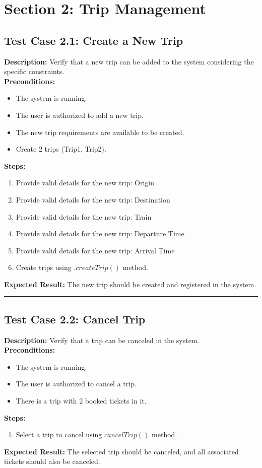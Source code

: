 \documentclass{article}
\begin{document}
\pagebreak

\section{Section 2: Trip Management}
\bigskip
\bigskip
\subsection{Test Case 2.1: Create a New Trip}

\textbf{Description:} Verify that a new trip can be added to the system considering the specific constraints.\\
\textbf{Preconditions:}
\begin{itemize}
  \item The system is running.
  \item The user is authorized to add a new trip.
  \item The new trip requirements are available to be created.
  \item Create 2 trips (Trip1, Trip2).
\end{itemize}
\textbf{Steps:}
\begin{enumerate}
  \item Provide valid details for the new trip: Origin
  \item Provide valid details for the new trip: Destination
  \item Provide valid details for the new trip: Train
  \item Provide valid details for the new trip: Departure Time
  \item Provide valid details for the new trip: Arrival Time
  \item Create trips using $.createTrip()$ method.
\end{enumerate}
\textbf{Expected Result:} The new trip should be created and registered in the system.

\bigskip
\hrule
\bigskip

\subsection{Test Case 2.2: Cancel Trip}

\textbf{Description:} Verify that a trip can be canceled in the system.\\
\textbf{Preconditions:}
\begin{itemize}
  \item The system is running.
  \item The user is authorized to cancel a trip.
  \item There is a trip with 2 booked tickets in it.
\end{itemize}
\textbf{Steps:}
\begin{enumerate}
  \item Select a trip to cancel using $cancelTrip()$ method.
\end{enumerate}
\textbf{Expected Result:} The selected trip should be canceled, and all associated tickets should also be canceled.
\end{document}
